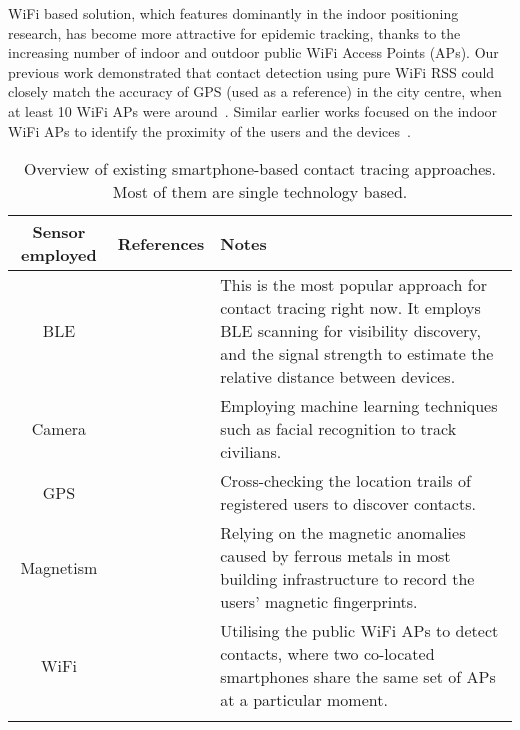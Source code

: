 \documentclass[graybox]{svmult}
\begin{document}
WiFi based solution, which features dominantly in the indoor positioning research, has become more attractive for epidemic tracking, thanks to the increasing number of indoor and outdoor public WiFi Access Points (APs). Our previous work demonstrated that contact detection using pure WiFi RSS could closely match the accuracy of GPS (used as a reference) in the city centre, when at least 10 WiFi APs were around~\cite{nguyen2015feasibility}. Similar earlier works focused on the indoor WiFi APs to identify the proximity of the users and the devices~\cite{carlotto2008proximity,krumm2004nearme}.
\begin{table}[h]
	\caption{Overview of existing smartphone-based contact tracing approaches. Most of them are single technology based.}
	\centering
	\begin{tabular}{c c p{10cm}}
		\toprule
		\textbf{Sensor employed} & \textbf{References} & \textbf{Notes} \\
		\midrule
		BLE & \cite{bay2020bluetrace,dehaye2020swisscovid,leith2020gaen,yoneki2011fluphone} & This is the most popular approach for contact tracing right now. It employs BLE scanning for visibility discovery, and the signal strength to estimate the relative distance between devices. \\ \addlinespace[0.2cm]
		
		Camera & \cite{preethika2020artificial,seetharaman74867177countries,tabari2020nations,vaughan2020tracking} & Employing machine learning techniques such as facial recognition to track civilians. \\ \addlinespace[0.2cm]
		
		GPS & \cite{raskar2020apps,sonmezdigital,wang2020new} & Cross-checking the location trails of registered users to discover contacts. \\ \addlinespace[0.2cm]
		
		Magnetism & \cite{jeon2017judging,jeong2019smartphone,nguyen2019location,nguyen2017co} & Relying on the magnetic anomalies caused by ferrous metals in most building infrastructure to record the users' magnetic fingerprints. \\ \addlinespace[0.2cm]
		
		WiFi & \cite{carlotto2008proximity,krumm2004nearme,nguyen2015feasibility} & Utilising the public WiFi APs to detect contacts, where two co-located smartphones share the same set of APs at a particular moment. \\ \addlinespace[0.2cm]
		
		\bottomrule
	\end{tabular}
	\label{literature}
\end{table}
\end{document}
